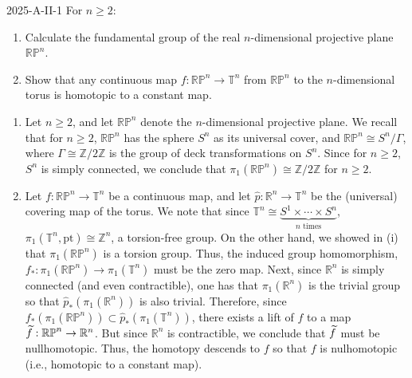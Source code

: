\documentclass{article}
\begin{document}
	\begin{prb}{2025-A-II-1}
		For $n \geq 2$: 
		\begin{enumerate}[itemsep =-2pt,label = (\roman{*})]
			\item Calculate the fundamental group of the real $n$-dimensional projective plane $\mathbb{RP}^{n}$. 
			\item Show that any continuous map $f: \mathbb{RP}^{n} \to \mathbb{T}^{n}$ from $\mathbb{RP}^{n}$ to the $n$-dimensional torus is homotopic to a constant map. 
		\end{enumerate}
	\end{prb}
	\begin{enumerate}[itemsep =-2pt,label = (\roman{*})]
		\item Let $n \geq 2$, and let $\mathbb{RP}^{n}$ denote the $n$-dimensional projective plane. We recall that for $n \geq 2$, $\mathbb{RP}^{n}$ has the sphere $S^{n}$ as its universal cover, and $\mathbb{RP}^{n} \cong S^{n}/\Gamma$, where $\Gamma \cong \mathbb{Z}/2\mathbb{Z}$ is the group of deck transformations on $S^{n}$. Since for $n\geq 2$, $S^{n}$ is simply connected, we conclude that $\pi_{1}(\mathbb{RP}^{n}) \cong \mathbb{Z}/2\mathbb{Z}$ for $n \geq 2$. 
		\item Let $f: \mathbb{RP}^{n} \to \mathbb{T}^{n}$ be a continuous map, and let $\hat{p}: \mathbb{R}^{n} \to \mathbb{T}^{n}$ be the (universal) covering map of the torus. We note that since $\mathbb{T}^{n} \cong \underbrace{S^{1} \times \dotsm \times S^{n}}_{n \text{ times}}$, $\pi_{1}(\mathbb{T}^{n}, \text{pt}) \cong \mathbb{Z}^{n}$, a torsion-free group. On the other hand, we showed in (i) that $\pi_{1}(\mathbb{RP}^{n})$ is a torsion group. Thus, the induced group homomorphism, $f_{\ast}: \pi_{1}(\mathbb{RP}^{n}) \to \pi_{1}(\mathbb{T}^{n})$ must be the zero map. Next, since $\mathbb{R}^{n}$ is simply connected (and even contractible), one has that $\pi_{1}(\mathbb{R}^{n})$ is the trivial group so that $\hat{p}_{\ast}(\pi_{1}(\mathbb{R}^n))$ is also trivial. Therefore, since $f_{\ast}(\pi_{1}(\mathbb{RP}^n)) \subset \hat{p}_{\ast}(\pi_{1}(\mathbb{T}^n))$, there exists a lift of $f$ to a map $\widetilde{f}: \mathbb{RP}^{n} \to \mathbb{R}^{n}$. But since $\mathbb{R}^{n}$ is contractible, we conclude that $\widetilde{f}$ must be nullhomotopic. Thus, the homotopy descends to $f$ so that $f$ is nulhomotopic (i.e., homotopic to a constant map). 
	\end{enumerate}
	
\end{document}

